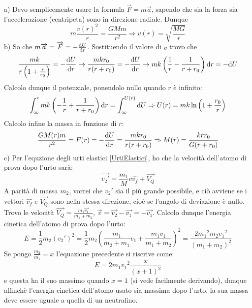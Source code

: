 \documentclass[../main.tex]{subfiles}
\begin{document}
\solution
a) Devo semplicemente usare la formula $\overrightarrow F = m\overrightarrow a$, sapendo che sia la forza sia l'accelerazione (centripeta) sono in direzione radiale. Dunque
\begin{equation}
 m\frac{v(r)^2}{r} = \frac{GMm}{r^2} \Rightarrow v(r) = \sqrt{\frac{MG}{r}}
\end{equation}
b) So che $m\overrightarrow a = \overrightarrow F = -\frac{\mathrm{d} U}{\mathrm{d} r}$. Sostituendo il valore di $v$ trovo che
\begin{equation}
  \frac{mk}{r\left ( 1+\frac{r}{r_0}\right )} = -\frac{\mathrm{d} U}{\mathrm{d} r} \rightarrow 
\frac{mkr_0}{r(r+r_0)} = -\frac{\mathrm{d} U}{\mathrm{d} r} \rightarrow mk\left ( \frac{1}{r} - \frac{1}{r+r_0}\right ) \mathrm{d} r = -\mathrm{d} U
\end{equation}
Calcolo dunque il potenziale, ponendolo nullo quando $r$ è infinito:
\begin{equation}
 \int_{\infty}^{r} mk\left ( -\frac{1}{r} + \frac{1}{r+r_0}\right ) \mathrm{d} r = \int_{\infty}^{U(r)} \mathrm{d} U \Rightarrow
 U(r) = mk \ln \left ( 1 + \frac{r_0}{r}\right )
\end{equation}
Calcolo infine la massa in funzione di $r$: 
\begin{equation}
 \frac{GM(r)m}{r^2} = F(r) = -\frac{\mathrm{d} U}{\mathrm{d} r} = \frac{mkr_0}{r(r+r_0)} \Rightarrow 
 M(r) = \frac{krr_0}{G(r+r_0)}
\end{equation}
c) Per l'equzione degli urti elastici \cref{UrtiElastici}, ho che la velocità dell'atomo di prova dopo l'urto sarà:
\begin{equation*}
 \overrightarrow {{v_2}'} = \frac{m_1}{M}v\hat{v_f}+\overrightarrow {V_Q}
\end{equation*}
A parità di massa $m_2$, vorrei che ${v_2}'$ sia il più grande possibile, e ciò avviene se i vettori $\hat{v_f}$ e $\overrightarrow {V_Q}$ sono nella stessa direzione, cioè se l'angolo di deviazione è nullo.
Trovo le velocità $\overrightarrow {V_Q} = \frac{m_1\overrightarrow {v_1}}{m_1+m_2}$, $\overrightarrow v = \overrightarrow {v_2}-\overrightarrow {v_1} = -\overrightarrow {v_1}$. Calcolo dunque l'energia cinetica dell'atomo di prova dopo l'urto:
$$ E = \frac{1}{2}m_2\left ( {v_2}'\right )^2 = \frac{1}{2} m_2 \left ( \frac{m_1}{m_2+m_1}v_1+\frac{m_1v_1}{m_1+m_2}\right )^2 = \frac{2{m_1}^2m_2{v_1}^2}{\left (m_1+m_2\right )^2} $$
Se pongo $\frac{m_2}{m_1} = x$ l'equazione precedente si riscrive come:
$$ E = 2m_1{v_1}^2\frac{x}{\left ( x+1\right )^2} $$ e questa ha il suo massimo quando $x = 1$ (si vede facilmente derivando), dunque affinchè l'energia cinetica dell'atomo usato sia massima dopo l'urto, la sua massa deve essere uguale a quella di un neutralino.
\end{document}
